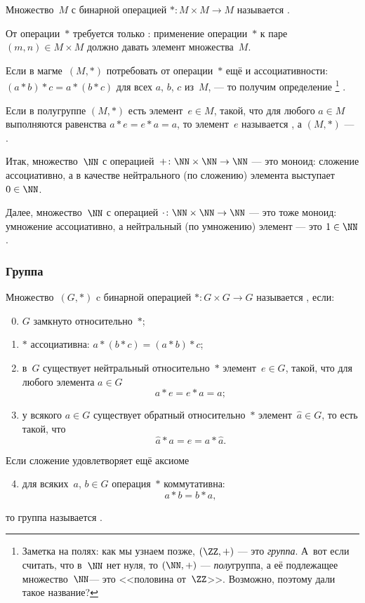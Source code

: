 \begin{definition}
	Множество~$M$ с бинарной операцией $* \colon M \times M \to M$ называется .
	\label{<+label+>}
\end{definition}
От операции~$*$ требуется только : применение операции~$*$ к паре $(m, n) \in M \times M$ должно давать элемент множества~$M$.

\begin{definition}
	Если в магме~$(M, *)$ потребовать от операции~$*$ ещё и ассоциативности: $(a
	* b) * c = a * (b * c)$ для всех $a$, $b$, $c$ из~$M$, --- то получим
	определение %
	\footnote{%
		Заметка на полях: как мы узнаем позже, $(\ZZ, +)$ --- это \emph{группа}.
		А~вот если считать, что в~$\NN$ нет нуля, то $(\NN, +)$ ---
		\emph{полу}группа, а её подлежащее множество~$\NN$--- это <<половина
		от~$\ZZ$>>. Возможно, поэтому дали такое название?
	}%
	.
\end{definition}

\begin{definition}
	Если в полугруппе $(M, *)$ есть элемент~$e \in M$, такой, что для любого $a \in M$ выполняются равенства $a * e = e * a = a$, то элемент~$e$ называется , а $(M, *)$ --- .
	\label{<+label+>}
\end{definition}

Итак, множество~$\NN$ с операцией~$+ \colon \NN \times \NN \to \NN$ --- это моноид: сложение ассоциативно, а в качестве нейтрального (по сложению) элемента выступает~$0 \in \NN$.

Далее, множество~$\NN$ с операцией $\cdot \colon \NN \times \NN \to \NN$ --- это тоже моноид: умножение ассоциативно, а нейтральный (по умножению) элемент --- это $1 \in \NN$.

\subsubsection{Группа}
\begin{definition}
	Множество~$(G, *)$ c бинарной операцией $* \colon G \times G \to G$ называется , если:
	\begin{enumerate}[1)]
		\setcounter{enumi}{-1}
		\item $G$ замкнуто относительно~$*$;
		\item $*$ ассоциативна: $a * (b * c) = (a * b) * c$;
		\item в~$G$ существует нейтральный относительно~$*$ элемент~$e \in G$, такой, что для любого элемента $a \in G$
			\[
				a * e = e * a = a
				;
			\]
		\item у всякого $a \in G$ существует обратный относительно~$*$ элемент~$\hat{a} \in G$, то есть такой, что
			\[
				\hat{a} * a = e = a * \hat{a}
				.
			\]
	\end{enumerate}
	Если сложение удовлетворяет ещё аксиоме
	\begin{enumerate}
		\setcounter{enumi}{3}
		\item для всяких~$a$, $b \in G$ операция~$*$ коммутативна:
			\[
				a * b = b * a,
			\]
	\end{enumerate}
	то группа называется .
	\label{<+label+>}
\end{definition}

